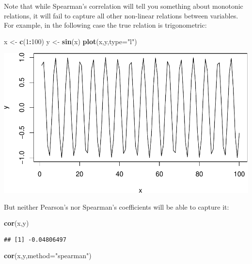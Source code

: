 \documentclass[
]{book}
\newenvironment{Shaded}{\begin{snugshade}}{\end{snugshade}}
\newcommand{\AttributeTok}[1]{\textcolor[rgb]{0.13,0.29,0.53}{#1}}
\newcommand{\DecValTok}[1]{\textcolor[rgb]{0.00,0.00,0.81}{#1}}
\newcommand{\FunctionTok}[1]{\textcolor[rgb]{0.13,0.29,0.53}{\textbf{#1}}}
\newcommand{\NormalTok}[1]{#1}
\newcommand{\OtherTok}[1]{\textcolor[rgb]{0.56,0.35,0.01}{#1}}
\newcommand{\SpecialCharTok}[1]{\textcolor[rgb]{0.81,0.36,0.00}{\textbf{#1}}}
\newcommand{\StringTok}[1]{\textcolor[rgb]{0.31,0.60,0.02}{#1}}
\theoremstyle{definition}
\theoremstyle{definition}
\theoremstyle{definition}
\theoremstyle{definition}
\theoremstyle{remark}
\begin{document}
Note that while Spearman's correlation will tell you something about monotonic relations, it will fail to capture all other non-linear relations between variables. For example, in the following case the true relation is trigonometric:

\begin{Shaded}
\begin{Highlighting}[]
\NormalTok{x }\OtherTok{\textless{}{-}} \FunctionTok{c}\NormalTok{(}\DecValTok{1}\SpecialCharTok{:}\DecValTok{100}\NormalTok{)}
\NormalTok{y }\OtherTok{\textless{}{-}} \FunctionTok{sin}\NormalTok{(x)}
\FunctionTok{plot}\NormalTok{(x,y,}\AttributeTok{type=}\StringTok{"l"}\NormalTok{)}
\end{Highlighting}
\end{Shaded}

\includegraphics{Svetunkov---Statistics-for-Business-Analytics_files/figure-latex/unnamed-chunk-53-1.pdf}

But neither Pearson's nor Spearman's coefficients will be able to capture it:

\begin{Shaded}
\begin{Highlighting}[]
\FunctionTok{cor}\NormalTok{(x,y)}
\end{Highlighting}
\end{Shaded}

\begin{verbatim}
## [1] -0.04806497
\end{verbatim}

\begin{Shaded}
\begin{Highlighting}[]
\FunctionTok{cor}\NormalTok{(x,y,}\AttributeTok{method=}\StringTok{"spearman"}\NormalTok{)}
\end{Highlighting}
\end{Shaded}
\end{document}
